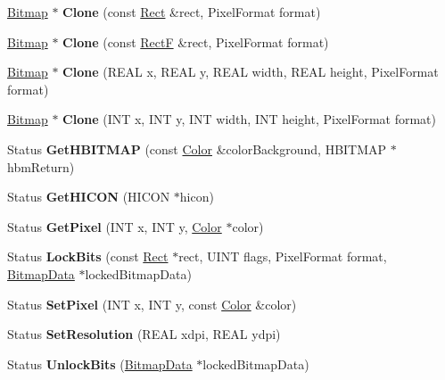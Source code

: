 \begin{DoxyCompactItemize}
\item 
\mbox{\label{class_bitmap_a0c9cc3370f92cdc67befe30b7311d142}} 
\hyperlink{class_bitmap}{Bitmap} $\ast$ {\bfseries Clone} (const \hyperlink{struct_rect}{Rect} \&rect, Pixel\+Format format)
\item 
\mbox{\label{class_bitmap_a624ea547066846ba6948390a4d939a3e}} 
\hyperlink{class_bitmap}{Bitmap} $\ast$ {\bfseries Clone} (const \hyperlink{struct_rect_f}{RectF} \&rect, Pixel\+Format format)
\item 
\mbox{\label{class_bitmap_a7b50c39933a2a80a59d5577f6510a469}} 
\hyperlink{class_bitmap}{Bitmap} $\ast$ {\bfseries Clone} (R\+E\+AL x, R\+E\+AL y, R\+E\+AL width, R\+E\+AL height, Pixel\+Format format)
\item 
\mbox{\label{class_bitmap_a35442332d11c1f86491ed012e4bff604}} 
\hyperlink{class_bitmap}{Bitmap} $\ast$ {\bfseries Clone} (I\+NT x, I\+NT y, I\+NT width, I\+NT height, Pixel\+Format format)
\item 
\mbox{\label{class_bitmap_a2faaebd91a02f383647be84bb0beddbd}} 
Status {\bfseries Get\+H\+B\+I\+T\+M\+AP} (const \hyperlink{struct_color}{Color} \&color\+Background, H\+B\+I\+T\+M\+AP $\ast$hbm\+Return)
\item 
\mbox{\label{class_bitmap_ac1f88c5ed0d6480207bc3c0994c150a9}} 
Status {\bfseries Get\+H\+I\+C\+ON} (H\+I\+C\+ON $\ast$hicon)
\item 
\mbox{\label{class_bitmap_aaf615d89020505a16b16d4bb93d718e8}} 
Status {\bfseries Get\+Pixel} (I\+NT x, I\+NT y, \hyperlink{struct_color}{Color} $\ast$color)
\item 
\mbox{\label{class_bitmap_ac83288e9d4f8d80ed1793511d28cc1fa}} 
Status {\bfseries Lock\+Bits} (const \hyperlink{struct_rect}{Rect} $\ast$rect, U\+I\+NT flags, Pixel\+Format format, \hyperlink{struct_bitmap_data}{Bitmap\+Data} $\ast$locked\+Bitmap\+Data)
\item 
\mbox{\label{class_bitmap_a9bfce5184e2bebd5b2b70fdf53f59ecd}} 
Status {\bfseries Set\+Pixel} (I\+NT x, I\+NT y, const \hyperlink{struct_color}{Color} \&color)
\item 
\mbox{\label{class_bitmap_ad29145038d446ffa6b300fe94a058cc6}} 
Status {\bfseries Set\+Resolution} (R\+E\+AL xdpi, R\+E\+AL ydpi)
\item 
\mbox{\label{class_bitmap_a7b648dcbeb13e9c869288e12b2c22c0b}} 
Status {\bfseries Unlock\+Bits} (\hyperlink{struct_bitmap_data}{Bitmap\+Data} $\ast$locked\+Bitmap\+Data)
\end{DoxyCompactItemize}
